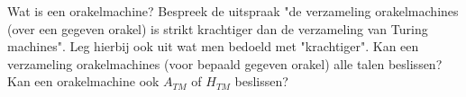 \begin{question}
	Wat is een orakelmachine? Bespreek de uitspraak "de verzameling orakelmachines (over een gegeven orakel) is strikt krachtiger dan de verzameling van Turing machines". Leg hierbij ook uit wat men bedoeld met "krachtiger". Kan een verzameling orakelmachines (voor bepaald gegeven orakel) alle talen beslissen? Kan een orakelmachine ook $A_{TM}$ of $H_{TM}$ beslissen?
\end{question}